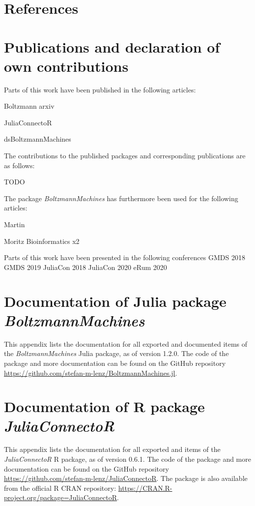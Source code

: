 \documentclass[12pt]{article}
\newcommand{\apkg}[1]{\emph{#1}}
\begin{document}
\begin{appendices}
\singlespacing
\section{References}

\renewcommand{\bibsection}{} %



\clearpage
\onehalfspacing
\section[Publications and declaration of own contributions]{Publications and declaration of \\ own contributions}
Parts of this work have been published in the following articles:

Boltzmann arxiv

JuliaConnectoR

dsBoltzmannMachines

The contributions to the published packages and corresponding publications are as follows:

TODO

The package \apkg{BoltzmannMachines} has furthermore been used for the following articles:

Martin

Moritz Bioinformatics x2

Parts of this work have been presented in the following conferences
GMDS 2018
GMDS 2019
JuliaCon 2018
JuliaCon 2020
eRum 2020

\setlength{\emergencystretch}{3em}


\clearpage
\section[Documentation of Julia package \apkg{BoltzmannMachines}]{Documentation of Julia package \\ \apkg{BoltzmannMachines}}
\label{BMDoku}

This appendix lists the documentation for all exported and documented items of the \apkg{BoltzmannMachines} Julia package, as of version 1.2.0. The code of the package and more documentation can be found on the GitHub repository \url{https://github.com/stefan-m-lenz/BoltzmannMachines.jl}.


\clearpage
\section[Documentation of R package \apkg{JuliaConnectoR}]{Documentation of R package \\ \apkg{JuliaConnectoR}}
This appendix lists the documentation for all exported and items of the \apkg{JuliaConnectoR} R package, as of version 0.6.1. The code of the package and more documentation can be found on the GitHub repository \url{https://github.com/stefan-m-lenz/JuliaConnectoR}. The package is also available from the official R CRAN repository: \url{https://CRAN.R-project.org/package=JuliaConnectoR}.


\end{appendices}
\end{document}
